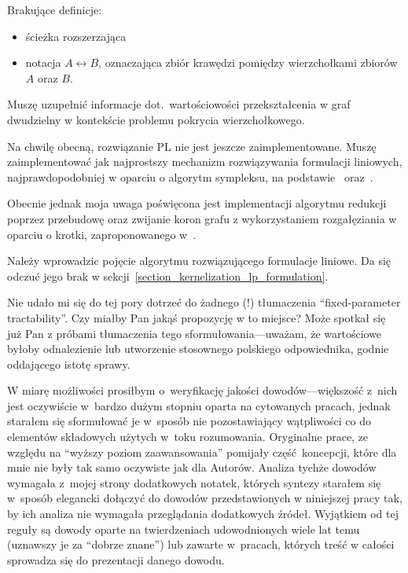 \begin{note}
  Brakujące definicje:
  \begin{itemize}
    \item ścieżka rozszerzająca
    \item notacja $A \leftrightarrow B$, oznaczająca zbiór krawędzi pomiędzy
      wierzchołkami zbiorów $A$ oraz $B$.
  \end{itemize}
\end{note}
\begin{note}
  Muszę uzupełnić informacje dot.\ wartościowości przekształcenia w graf
  dwudzielny w kontekście problemu pokrycia wierzchołkowego.
\end{note}
\begin{note}
  Na chwilę obecną, rozwiązanie PL nie jest jeszcze zaimplementowane.
  Muszę zaimplementować jak najprostszy mechanizm rozwiązywania formulacji
  liniowych, najprawdopodobniej w oparciu o algorytm sympleksu, na
  podstawie~\cite{sedgewick11} oraz~\cite{Cormen:2001:IA:580470}.


  Obecnie jednak moja uwaga poświęcona jest implementacji algorytmu redukcji 
  poprzez przebudowę oraz zwijanie koron grafu z wykorzystaniem rozgałęziania w
  oparciu o krotki, zaproponowanego w~\cite{ImprovedBounds10}. 
\end{note}
\begin{note}
  Należy wprowadzic pojęcie algorytmu rozwiązującego formulacje liniowe. 
  Da się odczuć jego brak w sekcji~\ref{section_kernelization_lp_formulation}.
\end{note}
\begin{note}
  Nie udało mi się do tej pory dotrzeć do żadnego (!) tłumaczenia
  ``fixed-parameter tractability''.
  Czy miałby Pan jakąś propozycję w to miejsce?
  Może spotkał się już Pan z próbami tłumaczenia tego sformułowania---uważam, że
  wartościowe byłoby odnalezienie lub utworzenie stosownego polskiego
  odpowiednika, godnie oddającego istotę sprawy. 
\end{note}
\begin{note}
  W miarę możliwości prosiłbym o~weryfikację jakości dowodów---większość z~nich
  jest oczywiście w~bardzo dużym stopniu oparta na cytowanych pracach, jednak
  starałem się sformułować je w~sposób nie pozostawiający wątpliwości co do
  elementów składowych użytych w~toku rozumowania.
  Oryginalne prace, ze względu na ``wyższy poziom zaawansowania'' pomijały
  część~koncepcji, które dla mnie nie były tak samo oczywiste jak dla Autorów.
  Analiza tychże dowodów wymagała z~mojej strony dodatkowych notatek, których
  syntezy starałem się w~sposób elegancki dołączyć do dowodów przedstawionych w
  niniejszej pracy tak, by ich analiza nie wymagała przeglądania dodatkowych
  źródeł.
  Wyjątkiem od tej reguły są dowody oparte na twierdzeniach udowodnionych wiele
  lat temu (uznawszy je za ``dobrze znane'') lub zawarte w~pracach, których 
  treść w całości sprowadza się do prezentacji danego dowodu.
\end{note}
